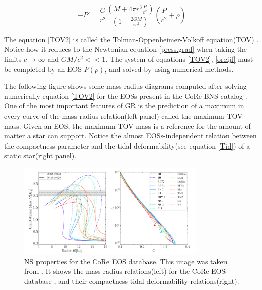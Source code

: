 \begin{equation}\label{TOV2}
- P' = \frac{G}{r^2} \frac{\left( M + 4\pi r^3 \frac{P}{c^2} \right)}{\left(  1 - \frac{2GM}{r c^2} \right)} \left( \frac{P}{c^2}+\rho \right)
\end{equation}

The equation \ref{TOV2} is called the Tolman-Oppenheimer-Volkoff equation(TOV) \cite{PhysRev.55.374}. Notice how it reduces to the Newtonian equation \ref{press.grad} when taking the limits $c\rightarrow \infty$ and $GM/c^2 <<1$. The system of equations \ref{TOV2}, \ref{oreijf} must be completed by an EOS $P(\rho)$, and solved by using numerical methods.

The following figure shows some mass radius diagrams computed after solving numerically equation \ref{TOV2} for the EOSs present in the CoRe BNS catalog \cite{Dietrich:2018phi}. One of the most important features of GR is the prediction of a maximum in every curve of the mass-radius relation(left panel) called the maximum TOV mass. Given an EOS, the maximum TOV mass is a reference for the amount of matter a star can support. Notice the almost EOSs-independent relation between the compactness parameter and the tidal deformability(see equation \ref{Tid}) of a static star(right panel).

\begin{figure}[hbt!]
\begin{center}
\includegraphics[width=0.8\textwidth, angle=0]{images/EOS_TOV.png}
\captionsetup{width=.8\textwidth}
\caption[NS properties for the CoRe EOS database]{NS properties for the CoRe EOS database. This image was taken from \cite{EOSDB}. It shows the mass-radius relations(left) for the CoRe EOS database \cite{Dietrich:2018phi}, and their compactness-tidal deformability relations(right).}
\label{equations of state and tidal deformability}
\end{center}
\end{figure}

\FloatBarrier

